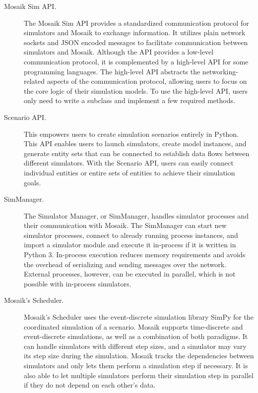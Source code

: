\begin{description}

    \item[Mosaik Sim API.] The Mosaik Sim API provides a standardized
        communication protocol for simulators and Mosaik to exchange
        information. It utilizes plain network sockets and JSON encoded messages
        to facilitate communication between simulators and Mosaik. Although the
        API provides a low-level communication protocol, it is complemented by a
        high-level API for some programming languages. The high-level API
        abstracts the networking-related aspects of the communication protocol,
        allowing users to focus on the core logic of their simulation models. To
        use the high-level API, users only need to write a subclass and
        implement a few required methods.

    \item[Scenario API.] This empowers users to create simulation scenarios
        entirely in Python. This API enables users to launch simulators, create
        model instances, and generate entity sets that can be connected to
        establish data flows between different simulators. With the Scenario
        API, users can easily connect individual entities or entire sets of
        entities to achieve their simulation goals.

    \item[SimManager.] The Simulator Manager, or SimManager, handles simulator
        processes and their communication with Mosaik. The SimManager can start
        new simulator processes, connect to already running process instances,
        and import a simulator module and execute it in-process if it is written
        in Python 3. In-process execution reduces memory requirements and avoids
        the overhead of serializing and sending messages over the network.
        External processes, however, can be executed in parallel, which is not
        possible with in-process simulators.

    \item[Mosaik's Scheduler.] Mosaik's Scheduler uses the event-discrete
        simulation library SimPy for the coordinated simulation of a scenario.
        Mosaik supports time-discrete and event-discrete simulations, as well as
        a combination of both paradigms. It can handle simulators with different
        step sizes, and a simulator may vary its step size during the
        simulation. Mosaik tracks the dependencies between simulators and only
        lets them perform a simulation step if necessary. It is also able to let
        multiple simulators perform their simulation step in parallel if they do
        not depend on each other's data.

\end{description}

